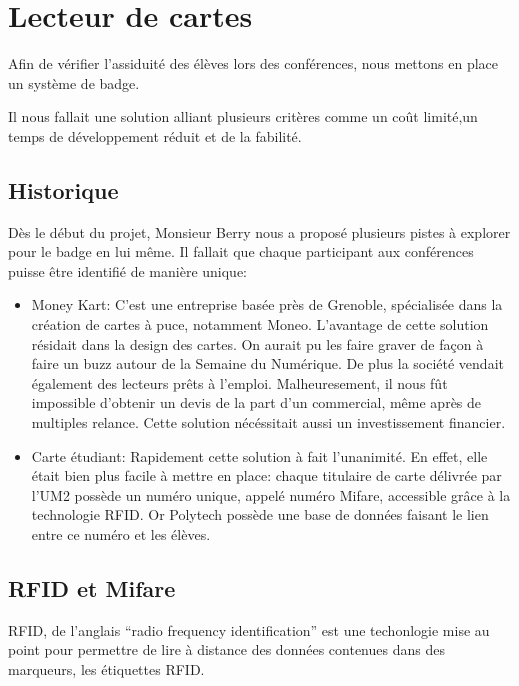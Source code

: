 \chapter{Lecteur de cartes}

Afin de vérifier l'assiduité des élèves lors des conférences, nous mettons en
place un système de badge.

Il nous fallait une solution alliant plusieurs critères comme un coût limité,un temps
de développement réduit et de la fabilité.


    \section{Historique}
Dès le début du projet, Monsieur Berry nous a proposé plusieurs pistes à 
explorer pour le badge en lui même. Il fallait que chaque participant aux
conférences puisse être identifié de manière unique:

\begin{itemize}
\item Money Kart: C'est une entreprise basée près de Grenoble, spécialisée
dans la création de cartes à puce, notamment Moneo. L'avantage de cette solution
résidait dans la design des cartes. On aurait pu les faire graver
de façon à faire un buzz autour de la Semaine du Numérique. De plus la société
vendait également des lecteurs prêts à l'emploi.
Malheuresement, il nous fût impossible d'obtenir un devis de la part d'un
commercial, même après de multiples relance. Cette solution nécéssitait aussi
un investissement financier.

\item Carte étudiant: Rapidement cette solution à fait l'unanimité. En effet,
elle était bien plus facile à mettre en place: chaque titulaire de carte délivrée
par l'UM2 possède un numéro unique, appelé numéro Mifare, accessible grâce à
la technologie RFID. Or Polytech possède une base de données faisant le lien entre
ce numéro et les élèves.
\end{itemize}


    \section{RFID et Mifare}
RFID, de l'anglais ``radio frequency identification'' est une techonlogie 
mise au point pour permettre de lire à distance des données contenues dans des
marqueurs, les étiquettes RFID.

